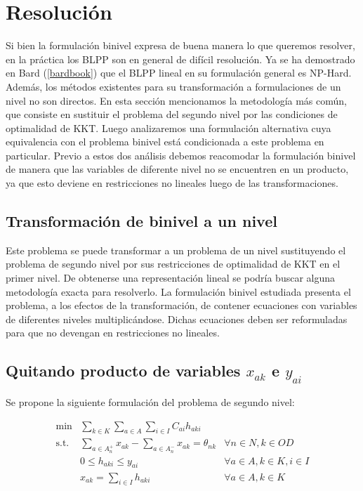 \documentclass{article}
\begin{document}
  \section{Resolución}

  Si bien la formulación binivel expresa de buena manera lo que queremos resolver, en la práctica los BLPP son en general de difícil resolución. Ya se ha demostrado en Bard (\ref{bardbook}) que el BLPP lineal en su formulación general es NP-Hard. Además, los métodos existentes para su transformación a formulaciones de un nivel no son directos. En esta sección mencionamos la metodología más común, que consiste en sustituir el problema del segundo nivel por las condiciones de optimalidad de KKT. Luego analizaremos una formulación alternativa cuya equivalencia con el problema binivel está condicionada a este problema en particular. Previo a estos dos análisis debemos reacomodar la formulación binivel de manera que las variables de diferente nivel no se encuentren en un producto, ya que esto deviene en restricciones no lineales luego de las transformaciones.

  \subsection{Transformación de binivel a un nivel}

  Este problema se puede transformar a un problema de un nivel sustituyendo el problema de segundo nivel por sus restricciones de optimalidad de KKT en el primer nivel. De obtenerse una representación lineal se podría buscar alguna metodología exacta para resolverlo. La formulación binivel estudiada presenta el problema, a los efectos de la transformación, de contener ecuaciones con variables de diferentes niveles multiplicándose. Dichas ecuaciones deben ser reformuladas para que no devengan en restricciones no lineales.

  \subsection{Quitando producto de variables $x_{ak}$ e $y_{ai}$}

  Se propone la siguiente formulación del problema de segundo nivel:

  \begin{align}
    \text{min}  & \sum_{k \in K} \sum_{a \in A} \sum_{i \in I} C_{ai} h_{aki}         & \label{eq:subproblemrefeq1} \\
    \text{s.t.} & \sum_{a \in A_n^+} x_{ak} - \sum_{a \in A_n^-} x_{ak} = \theta_{nk} & \forall n \in N, k \in OD \\
                & 0 \leq h_{aki} \leq y_{ai}                                          & \forall a \in A, k \in K, i \in I \\
                & x_{ak} = \sum_{i \in I} h_{aki}                                     & \forall a \in A, k \in K
  \end{align}
\end{document}
